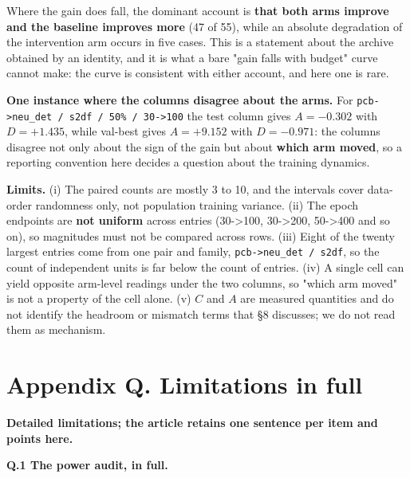 \documentclass[pdflatex,sn-mathphys-ay]{sn-jnl}
\begin{document}
Where the gain does fall, the dominant account is \textbf{that both arms improve and the baseline improves more} (47 of 55), while an absolute degradation of the intervention arm occurs in five cases. This is a statement about the archive obtained by an identity, and it is what a bare "gain falls with budget" curve cannot make: the curve is consistent with either account, and here one is rare.

\textbf{One instance where the columns disagree about the arms.} For \texttt{pcb-\textgreater{}neu\_det / s2df / 50\% / 30-\textgreater{}100} the test column gives $A=-0.302$ with $D=+1.435$, while val-best gives $A=+9.152$ with $D=-0.971$: the columns disagree not only about the sign of the gain but about \textbf{which arm moved}, so a reporting convention here decides a question about the training dynamics.

\textbf{Limits.} (i) The paired counts are mostly 3 to 10, and the intervals cover data-order randomness only, not population training variance. (ii) The epoch endpoints are \textbf{not uniform} across entries (30-\textgreater{}100, 30-\textgreater{}200, 50-\textgreater{}400 and so on), so magnitudes must not be compared across rows. (iii) Eight of the twenty largest entries come from one pair and family, \texttt{pcb-\textgreater{}neu\_det / s2df}, so the count of independent units is far below the count of entries. (iv) A single cell can yield opposite arm-level readings under the two columns, so "which arm moved" is not a property of the cell alone. (v) $C$ and $A$ are measured quantities and do not identify the headroom or mismatch terms that \S{}8 discusses; we do not read them as mechanism.

\section*{Appendix Q. Limitations in full}

\textbf{Detailed limitations; the article retains one sentence per item and points here.}

\textbf{Q.1 The power audit, in full.}
\end{document}

